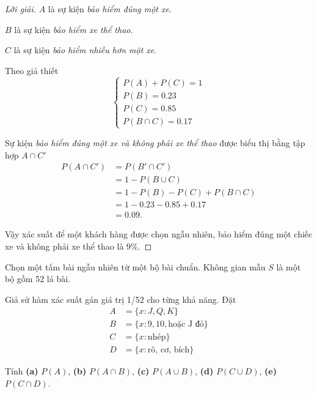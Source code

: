 \documentclass[class=probandstats,crop=false]{standalone}
\begin{document}
\begin{proof}[Lời giải]
    \par $A$ là sự kiện \textit{bảo hiểm đúng một xe}.
    \par $B$ là sự kiện \textit{bảo hiểm xe thể thao}.
    \par $C$ là sự kiện \textit{bảo hiểm nhiều hơn một xe}.
    \par Theo giả thiết
    \[
        \begin{cases}
            P(A) + P(C) = 1 \\
            P(B) = 0.23     \\
            P(C) = 0.85     \\
            P(B\cap C) = 0.17
        \end{cases}
    \]
    \par Sự kiện \textit{bảo hiểm đúng một xe và không phải xe thể thao} được biểu thị bằng tập hợp $A\cap C'$
    \begin{align*}
        P(A\cap C') & = P(B'\cap C')                 \\
                    & = 1 - P(B\cup C)               \\
                    & = 1 - P(B) - P(C) + P(B\cap C) \\
                    & = 1 - 0.23 - 0.85 + 0.17       \\
                    & = 0.09.
    \end{align*}
    \par Vậy xác suất để một khách hàng được chọn ngẫu nhiên, bảo hiểm đúng một chiếc xe và không phải xe thể thao là 9\%.
\end{proof}

\begin{exercise}
    \par Chọn một tấm bài ngẫu nhiên từ một bộ bài chuẩn. Không gian mẫu $S$ là một bộ gồm 52 lá bài.
    \par Giả sử hàm xác suất gán giá trị 1/52 cho từng khả năng. Đặt
    \begin{align*}
        A & = \{ x: J, Q, K \}                 \\
        B & = \{ x: 9, 10, \text{hoặc J đỏ} \} \\
        C & = \{ x: \text{nhép} \}             \\
        D & = \{ x: \text{rô, cơ, bích} \}
    \end{align*}
    \par Tính \textbf{(a)} $P(A)$, \textbf{(b)} $P(A\cap B)$, \textbf{(c)} $P(A\cup B)$, \textbf{(d)} $P(C\cup D)$, \textbf{(e)} $P(C\cap D)$.
\end{exercise}
\end{document}

